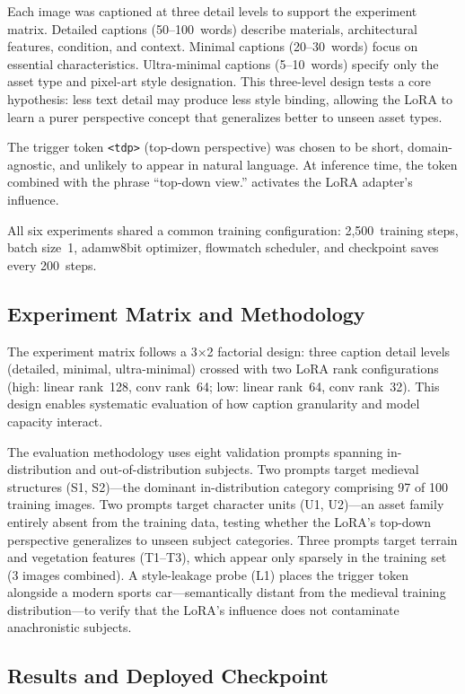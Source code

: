 \documentclass[conference]{IEEEtran}
\begin{document}
Each image was captioned at three detail levels to support the experiment
matrix. Detailed captions (50--100~words) describe materials, architectural
features, condition, and context. Minimal captions (20--30~words) focus on
essential characteristics. Ultra-minimal captions (5--10~words) specify
only the asset type and pixel-art style designation. This three-level
design tests a core hypothesis: less text detail may produce less style
binding, allowing the LoRA to learn a purer perspective concept that
generalizes better to unseen asset types.

The trigger token \texttt{<tdp>} (top-down perspective) was chosen to be
short, domain-agnostic, and unlikely to appear in natural language. At
inference time, the token combined with the phrase ``top-down view.''
activates the LoRA adapter's influence.

All six experiments shared a common training configuration: 2,500~training
steps, batch size~1, adamw8bit optimizer, flowmatch scheduler, and
checkpoint saves every 200~steps.

\subsection{Experiment Matrix and Methodology}

The experiment matrix follows a 3$\times$2 factorial design: three caption
detail levels (detailed, minimal, ultra-minimal) crossed with two LoRA rank
configurations (high: linear rank~128, conv rank~64; low: linear rank~64,
conv rank~32). This design enables systematic evaluation of how caption
granularity and model capacity interact.

The evaluation methodology uses eight validation prompts spanning
in-distribution and out-of-distribution subjects. Two prompts target
medieval structures (S1, S2)---the dominant in-distribution category
comprising 97 of 100 training images. Two prompts target character units
(U1, U2)---an asset family entirely absent from the training data, testing
whether the LoRA's top-down perspective generalizes to unseen subject
categories. Three prompts target terrain and vegetation features (T1--T3),
which appear only sparsely in the training set (3 images combined). A
style-leakage probe (L1) places the trigger token alongside a modern sports
car---semantically distant from the medieval training distribution---to
verify that the LoRA's influence does not contaminate anachronistic
subjects.

\subsection{Results and Deployed Checkpoint}
\end{document}
